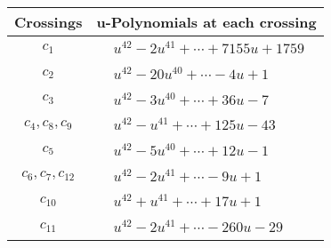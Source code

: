 \documentclass[1p]{elsarticle_modified}
\theoremstyle{definition}
\begin{document}
\begin{tabular}{m{50pt}|m{274pt}}
Crossings & \hspace{64pt}u-Polynomials at each crossing \\
\hline $$\begin{aligned}c_{1}\end{aligned}$$&$\begin{aligned}
&u^{42}-2 u^{41}+\cdots+7155 u+1759
\end{aligned}$\\
\hline $$\begin{aligned}c_{2}\end{aligned}$$&$\begin{aligned}
&u^{42}-20 u^{40}+\cdots-4 u+1
\end{aligned}$\\
\hline $$\begin{aligned}c_{3}\end{aligned}$$&$\begin{aligned}
&u^{42}-3 u^{40}+\cdots+36 u-7
\end{aligned}$\\
\hline $$\begin{aligned}c_{4},c_{8},c_{9}\end{aligned}$$&$\begin{aligned}
&u^{42}- u^{41}+\cdots+125 u-43
\end{aligned}$\\
\hline $$\begin{aligned}c_{5}\end{aligned}$$&$\begin{aligned}
&u^{42}-5 u^{40}+\cdots+12 u-1
\end{aligned}$\\
\hline $$\begin{aligned}c_{6},c_{7},c_{12}\end{aligned}$$&$\begin{aligned}
&u^{42}-2 u^{41}+\cdots-9 u+1
\end{aligned}$\\
\hline $$\begin{aligned}c_{10}\end{aligned}$$&$\begin{aligned}
&u^{42}+u^{41}+\cdots+17 u+1
\end{aligned}$\\
\hline $$\begin{aligned}c_{11}\end{aligned}$$&$\begin{aligned}
&u^{42}-2 u^{41}+\cdots-260 u-29
\end{aligned}$\\
\hline
\end{tabular}\\~\\
\end{document}
